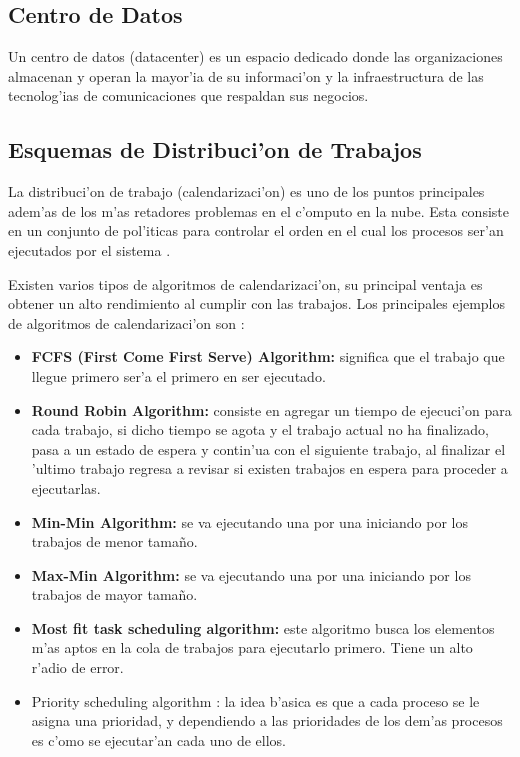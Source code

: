 \subsection*{Centro de Datos}
Un centro de datos (datacenter) es un espacio dedicado donde las organizaciones almacenan y operan la mayor'ia de su informaci'on y la infraestructura de las tecnolog'ias de comunicaciones que respaldan sus negocios.\cite{whatisdatacenter}

\subsection*{Esquemas de Distribuci'on de Trabajos}

La distribuci'on de trabajo (calendarizaci'on) es uno de los puntos principales adem'as de los m'as retadores problemas en el c'omputo en la nube\cite{li2014greedy}. Esta consiste en un conjunto de pol'iticas para controlar el orden en el cual los procesos ser'an ejecutados por el sistema \cite{agarwal2014efficient}.

Existen varios tipos de algoritmos de calendarizaci'on, su principal ventaja es obtener un alto rendimiento al cumplir con las trabajos. Los principales ejemplos de algoritmos de calendarizaci'on son \cite{salot2013survey}:

\begin{itemize}
\item \textbf{FCFS (First Come First Serve) Algorithm:} significa que el trabajo que llegue primero ser'a el primero en ser ejecutado.
\item \textbf{Round Robin Algorithm:} consiste en agregar un tiempo de ejecuci'on para cada trabajo, si dicho tiempo se agota y el trabajo actual no ha finalizado, pasa a un estado de espera y contin'ua con el siguiente trabajo, al finalizar el 'ultimo trabajo regresa a revisar si existen trabajos en espera para proceder a ejecutarlas. 
\item  \textbf{Min-Min Algorithm:} se va ejecutando una por una iniciando por los trabajos de menor tamaño.
\item  \textbf{Max-Min Algorithm:} se va ejecutando una por una iniciando por los trabajos de mayor tamaño.
\item  \textbf{Most fit task scheduling algorithm:} este algoritmo busca los elementos m'as aptos en la cola de trabajos para ejecutarlo primero. Tiene un alto r'adio de error.
\item Priority scheduling algorithm : la idea b'asica es que a cada proceso se le asigna una prioridad, y dependiendo a las prioridades de los dem'as procesos es c'omo se ejecutar'an cada uno de ellos.
\end{itemize}

